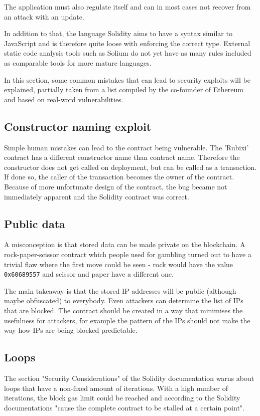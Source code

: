 The application must also regulate itself and can in most cases not recover from an attack with an update.

In addition to that, the language Solidity aims to have a syntax similar to JavaScript and is therefore quite loose with enforcing the correct type. External static code analysis tools such as Solium \cite{Solium} do not yet have as many rules included as comparable tools for more mature languages.

In this section, some common mistakes that can lead to security exploits will be explained, partially taken from a list compiled by the co-founder of Ethereum \cite{ThinkingAboutSmartContractSecurity} and based on real-word vulnerabilities.

\subsection{Constructor naming exploit}
Simple human mistakes can lead to the contract being vulnerable. The 'Rubixi' contract has a different constructor name than contract name. Therefore the constructor does not get called on deployment, but can be called as a transaction. If done so, the caller of the transaction becomes the owner of the contract. Because of more unfortunate design of the contract, the bug became not immediately apparent and the Solidity contract was correct.



\subsection{Public data}
A misconception is that stored data can be made private on the blockchain. A rock-paper-scissor contract which people used for gambling turned out to have a trivial flaw where the first move could be seen - rock would have the value \texttt{0x60689557} and scissor and paper have a different one.

The main takeaway is that the stored IP addresses will be public (although maybe obfuscated) to everybody. Even attackers can determine the list of IPs that are blocked. The contract should be created in a way that minimises the usefulness for attackers, for example the pattern of the IPs should not make the way how IPs are being blocked predictable.

\subsection{Loops}
The section "Security Considerations" of the Solidity documentation warns about loops that have a non-fixed amount of iterations. With a high number of iterations, the block gas limit could be reached and according to the Solidity documentations "cause the complete contract to be stalled at a certain point".

